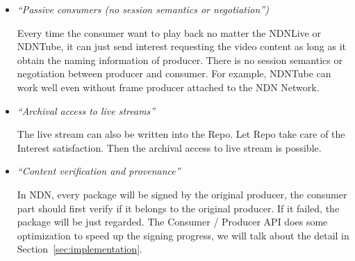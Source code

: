 \begin{itemize}
\item{\textit{``Passive consumers (no session semantics or negotiation'')}}

Every time the consumer want to play back no matter the NDNLive or NDNTube, it can just send interest requesting the video content as long as it obtain the naming information of producer. There is no session semantics or negotiation between producer and consumer. For example, NDNTube can work well even without frame producer attached to the NDN Network.

\item{\textit{``Archival access to live streams''}}

The live stream can also be written into the Repo. Let Repo take care of the Interest satisfaction. Then the archival access to live stream is possible.

\item{\textit{``Content verification and provenance''}}

In NDN, every package will be signed by the original producer, the consumer part should first verify if it belongs to the original producer. If it failed, the package will be just regarded. The Consumer / Producer API does some optimization to speed up the signing progress, we will talk about the detail in Section~\ref{sec:implementation}.

\end{itemize} 

